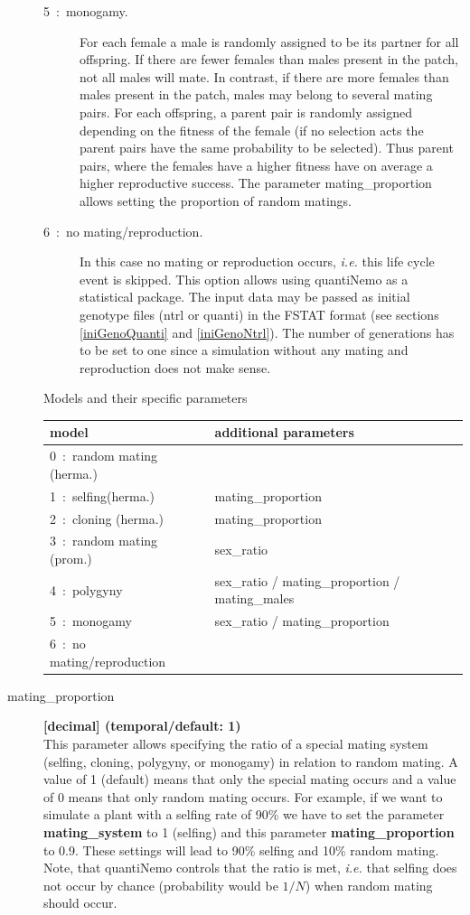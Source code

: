 \documentclass[letterpaper,12pt,oneside]{book}
\begin{document}
\begin{description}
\begin{description}
\item [5~:~monogamy.] For each female a male is randomly assigned to be its partner for all offspring. If there are fewer females than males present in the patch, not all males will mate. In contrast, if there are more females than males present in the patch, males may belong to several mating pairs. For each offspring, a parent pair is randomly assigned depending on the fitness of the female (if no selection acts the parent pairs have the same probability to be selected). Thus parent pairs, where the females have a higher fitness have on average a higher reproductive success. The parameter \textsf{mating\_proportion} allows setting the proportion of random matings.

\item [6~:~no mating/reproduction.] In this case no mating or reproduction occurs, \textit{i.e.} this life cycle event is skipped. This option allows using quantiNemo as a statistical package. The input data may be passed as initial genotype files (ntrl or quanti) in the FSTAT format (see sections \ref{iniGenoQuanti} and \ref{iniGenoNtrl}). The number of generations has to be set to one since a simulation without any mating and reproduction does not make sense.

\end{description}

Models and their specific parameters\\

\begin{tabular}{ll}
 \hline model & additional parameters \\ 
 \hline  0~:~random mating (herma.) & \\
 1~:~selfing(herma.)      & mating\_proportion \\
 2~:~cloning (herma.)      & mating\_proportion \\
 3~:~random mating (prom.) & sex\_ratio \\
 4~:~polygyny              & sex\_ratio / mating\_proportion / mating\_males \\
 5~:~monogamy              & sex\_ratio / mating\_proportion \\
 6~:~no mating/reproduction & \\
 \hline
\end{tabular}

\item[mating\_proportion\index{mating\_proportion}] \textbf{[decimal] (temporal/default: 1)}\\
This parameter allows specifying the ratio of a special mating system (selfing, cloning, polygyny, or monogamy) in relation to random mating. A value of 1 (default) means that only the special mating occurs and a value of 0 means that only random mating occurs. For example, if we want to simulate a plant with a selfing rate of 90\% we have to set the parameter \textbf{mating\_system} to 1 (selfing) and this parameter \textbf{mating\_proportion} to 0.9. These settings will lead to 90\% selfing and 10\% random mating. Note, that quantiNemo controls that the ratio is met, \textit{i.e.} that selfing does not occur by chance (probability would be $1/N$) when random mating should occur.


\end{description}
\end{document}
